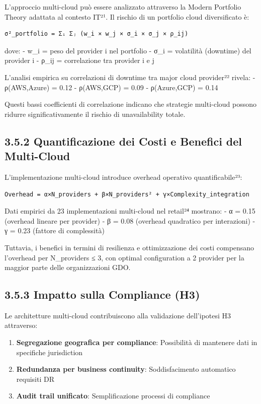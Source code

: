 \documentclass[12pt,a4paper,oneside]{book}
\providecommand{\tightlist}{%
  \setlength{\itemsep}{0pt}\setlength{\parskip}{0pt}
}
\numberwithin{figure}{chapter} %
\numberwithin{table}{chapter}  %
\begin{document}
L'approccio multi-cloud può essere analizzato attraverso la Modern
Portfolio Theory adattata al contesto IT²¹. Il rischio di un portfolio
cloud diversificato è:

\begin{verbatim}
σ²_portfolio = Σᵢ Σⱼ (w_i × w_j × σ_i × σ_j × ρ_ij)
\end{verbatim}

dove: - w\_i = peso del provider i nel portfolio - σ\_i = volatilità
(downtime) del provider i - ρ\_ij = correlazione tra provider i e j

L'analisi empirica su correlazioni di downtime tra major cloud
provider²² rivela: - ρ(AWS,Azure) = 0.12 - ρ(AWS,GCP) = 0.09 -
ρ(Azure,GCP) = 0.14

Questi bassi coefficienti di correlazione indicano che strategie
multi-cloud possono ridurre significativamente il rischio di
unavailability totale.

\subsection{3.5.2 Quantificazione dei Costi e Benefici del
Multi-Cloud}\label{quantificazione-dei-costi-e-benefici-del-multi-cloud}

L'implementazione multi-cloud introduce overhead operativo
quantificabile²³:

\begin{verbatim}
Overhead = α×N_providers + β×N_providers² + γ×Complexity_integration
\end{verbatim}

Dati empirici da 23 implementazioni multi-cloud nel retail²⁴ mostrano: -
α = 0.15 (overhead lineare per provider) - β = 0.08 (overhead quadratico
per interazioni) - γ = 0.23 (fattore di complessità)

Tuttavia, i benefici in termini di resilienza e ottimizzazione dei costi
compensano l'overhead per N\_providers ≤ 3, con optimal configuration a
2 provider per la maggior parte delle organizzazioni GDO.

\subsection{3.5.3 Impatto sulla Compliance
(H3)}\label{impatto-sulla-compliance-h3}

Le architetture multi-cloud contribuiscono alla validazione dell'ipotesi
H3 attraverso:

\begin{enumerate}
\def\labelenumi{\arabic{enumi}.}
\tightlist
\item
  \textbf{Segregazione geografica per compliance}: Possibilità di
  mantenere dati in specifiche jurisdiction
\item
  \textbf{Redundanza per business continuity}: Soddisfacimento
  automatico requisiti DR
\item
  \textbf{Audit trail unificato}: Semplificazione processi di compliance
\end{enumerate}
\end{document}
